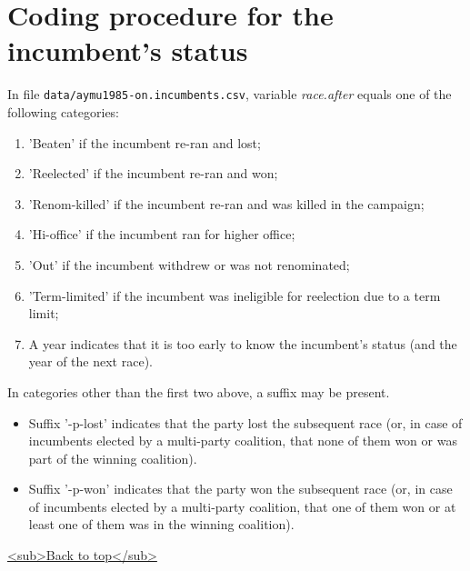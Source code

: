 \documentclass[11pt]{article}
\begin{document}
\section{Coding procedure for the incumbent's status\label{orgb2d0574}}
\label{sec:org1107278}
In file \texttt{data/aymu1985-on.incumbents.csv}, variable \emph{race.after} equals one of the following categories: 
\begin{enumerate}
\item 'Beaten' if the incumbent re-ran and lost;
\item 'Reelected' if the incumbent re-ran and won;
\item 'Renom-killed' if the incumbent re-ran and was killed in the campaign;
\item 'Hi-office' if the incumbent ran for higher office;
\item 'Out' if the incumbent withdrew or was not renominated;
\item 'Term-limited' if the incumbent was ineligible for reelection due to a term limit;
\item A year indicates that it is too early to know the incumbent's status (and the year of the next race).
\end{enumerate}
In categories other than the first two above, a suffix may be present. 
\begin{itemize}
\item Suffix '-p-lost' indicates that the party lost the subsequent race (or, in case of incumbents elected by a multi-party coalition, that none of them won or was part of the winning coalition).
\item Suffix '-p-won' indicates that the party won the subsequent race (or, in case of incumbents elected by a multi-party coalition, that one of them won or at least one of them was in the winning coalition).
\end{itemize}
\hyperref[org5520298]{<sub>Back to top</sub>}
\end{document}
